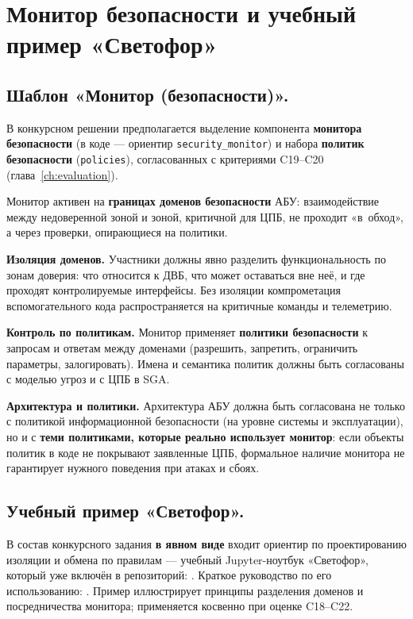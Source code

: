 \section{Монитор безопасности и учебный пример «Светофор»}
\label{sec:monitor-traffic}

\subsection{Шаблон «Монитор (безопасности)».} 

В конкурсном решении предполагается выделение компонента \textbf{монитора безопасности} (в коде --- ориентир \texttt{security\_monitor}) и набора \textbf{политик безопасности} (\texttt{policies}), согласованных с критериями C19--C20 (глава~\ref{ch:evaluation}). 

Монитор активен на \textbf{границах доменов безопасности} АБУ: взаимодействие между недоверенной зоной и зоной, критичной для ЦПБ, не проходит «в~обход», а через проверки, опирающиеся на политики.

\textbf{Изоляция доменов.} Участники должны явно разделить функциональность по зонам доверия: что относится к ДВБ, что может оставаться вне неё, и где проходят контролируемые интерфейсы. Без изоляции компрометация вспомогательного кода распространяется на критичные команды и телеметрию.

\textbf{Контроль по политикам.} Монитор применяет \textbf{политики безопасности} к запросам и ответам между доменами (разрешить, запретить, ограничить параметры, залогировать). Имена и семантика политик должны быть согласованы с моделью угроз и с ЦПБ в SGA.

\textbf{Архитектура и политики.} Архитектура АБУ должна быть согласована не только с политикой информационной безопасности (на уровне системы и эксплуатации), но и с \textbf{теми политиками, которые реально использует монитор}: если объекты политик в коде не покрывают заявленные ЦПБ, формальное наличие монитора не гарантирует нужного поведения при атаках и сбоях.

\subsection{Учебный пример «Светофор».} 

В состав конкурсного задания \textbf{в явном виде} входит ориентир по проектированию изоляции и обмена по правилам --- учебный Jupyter-ноутбук «Светофор», который уже включён в репозиторий: . Краткое руководство по его использованию: . Пример иллюстрирует принципы разделения доменов и посредничества монитора; применяется косвенно при оценке C18--C22.

